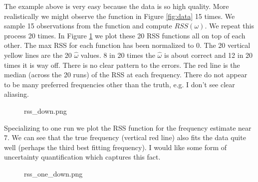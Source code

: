 \documentclass[12pt]{article}
\begin{document}
  The example above is very easy because the data is so high quality. More realistically we might observe the function in Figure \ref{fig:data} 15 times. We sample 15 observations from the function and compute $RSS(\omega)$. We repeat this process 20 times. In Figure \ref{fig:rss_down} we plot these 20 RSS functions all on top of each other. The max RSS for each function has been normalized to $0$. The 20 vertical yellow lines are the 20 $\widehat{\omega}$ values. 8 in 20 times the $\widehat{\omega}$ is about correct and 12 in 20 times it is way off. There is no clear pattern to the errors. The red line is the median (across the 20 runs) of the RSS at each frequency. There do not appear to be many preferred frequencies other than the truth, e.g. I don't see clear aliasing.
  

  \begin{figure}[H]
    \begin{center}
      \begin{includegraphics}[scale=0.4]{rss_down.png}
        \caption{\label{fig:rss_down}}
      \end{includegraphics}
    \end{center}
  \end{figure}
  

  Specializing to one run we plot the RSS function for the frequency estimate near $7$. We can see that the true frequency (vertical red line) also fits the data quite well (perhaps the third best fitting frequency). I would like some form of uncertainty quantification which captures this fact.

  \begin{figure}[H]
    \begin{center}
      \begin{includegraphics}[scale=0.4]{rss_one_down.png}
        \caption{\label{fig:rss_one_down}}
      \end{includegraphics}
    \end{center}
  \end{figure}
  
  

  


%
%
\end{document}
